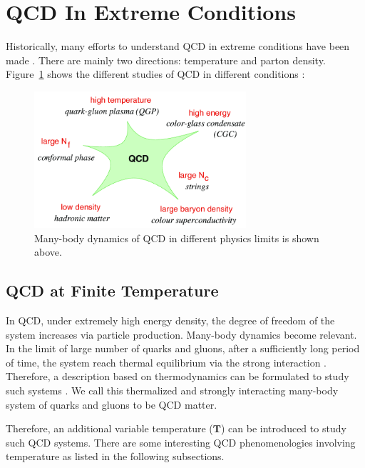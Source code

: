 \section{QCD In Extreme Conditions}

Historically, many efforts to understand QCD in extreme conditions have been made \cite{QCDExtreme}. There are mainly two directions: temperature and parton density. Figure~\ref{QCDConds} shows the different studies of QCD in different conditions \cite{QCDDiffConds}:


\begin{figure}[hbtp]
\begin{center}
\includegraphics[width=0.70\textwidth]{Figures/Chapter1/ManyBodyQCD.png}
\caption{Many-body dynamics of QCD in different physics limits is shown above.}
\label{QCDConds}
\end{center}
\end{figure} 

\subsection{QCD at Finite Temperature}

In QCD, under extremely high energy density, the degree of freedom of the system increases via particle production. Many-body dynamics become relevant. In the limit of large number of quarks and gluons, after a sufficiently long period of time, the system reach thermal equilibrium via the strong interaction \cite{MLBThermal,ADSCFTThermal,QCDThermal}. Therefore, a description based on thermodynamics can be formulated to study such systems \cite{QCDThemDyn}. We call this thermalized and strongly interacting many-body system of quarks and gluons to be QCD matter.

Therefore, an additional variable temperature ($\mathbf{T}$) can be introduced to study such QCD systems. There are some interesting QCD phenomenologies involving temperature as listed in the following subsections.

